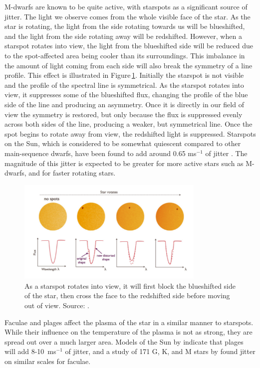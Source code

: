 M-dwarfs are known to be quite active, with starspots as a significant source of jitter. The light we observe comes from the whole visible face of the star. As the star is rotating, the light from the side rotating towards us will be blueshifted, and the light from the side rotating away will be redshifted. However, when a starspot rotates into view, the light from the blueshifted side will be reduced due to the spot-affected area being cooler than its surroundings. This imbalance in the amount of light coming from each side will also break the symmetry of a line profile. This effect is illustrated in Figure\,\ref{figSpotRotation}. Initially the starspot is not visible and the profile of the spectral line is symmetrical. As the starspot rotates into view, it suppresses some of the blueshifted flux, changing the profile of the blue side of the line and producing an asymmetry. Once it is directly in our field of view the symmetry is restored, but only because the flux is suppressed evenly across both sides of the line, producing a weaker, but symmetrical line. Once the spot begins to rotate away from view, the redshifted light is suppressed. Starspots on the Sun, which is considered to be somewhat quiescent compared to other main-sequence dwarfs, have been found to add around 0.65 ms$^{-1}$ of jitter \citep{2009Makarov}. The magnitude of this jitter is expected to be greater for more active stars such as M-dwarfs, and for faster rotating stars.\\

\begin{figure}
    \centering
    \includegraphics[width=0.8\textwidth]{SpotRotation.png}
    \caption{As a starspot rotates into view, it will first block the blueshifted side of the star, then cross the face to the redshifted side before moving out of view. Source: \citet{2015Haywood}.}
    \label{figSpotRotation}
\end{figure}

Faculae and plages affect the plasma of the star in a similar manner to starspots. While their influence on the temperature of the plasma is not as strong, they are spread out over a much larger area. Models of the Sun by \citet{2010Meunier} indicate that plages will add 8-10~ms$^{-1}$ of jitter, and a study of 171 G, K, and M stars by \citet{2020Hojjatpanah} found jitter on similar scales for faculae.\\

